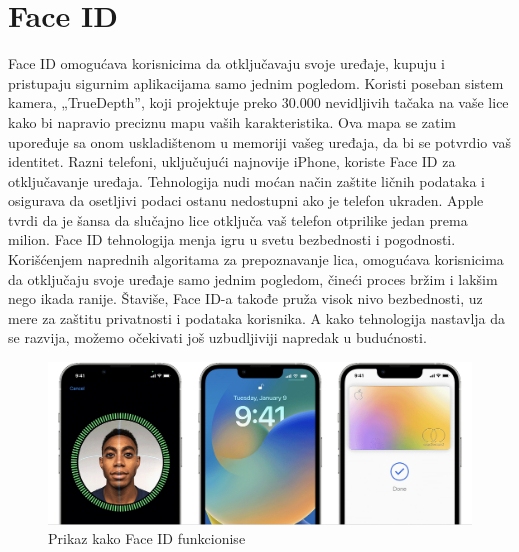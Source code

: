 \documentclass[a4paper]{article}
\begin{document}
\section{Face ID}
\label{sec:faceid}
Face ID omogućava korisnicima da otključavaju svoje uređaje, kupuju i pristupaju sigurnim aplikacijama samo jednim pogledom. Koristi poseban sistem kamera, „TrueDepth”, koji projektuje preko 30.000 nevidljivih tačaka na vaše lice kako bi napravio preciznu mapu vaših karakteristika. Ova mapa se zatim upoređuje sa onom uskladištenom u memoriji vašeg uređaja, da bi se potvrdio vaš identitet. 
Razni telefoni, uključujući najnovije iPhone, koriste Face ID za otključavanje uređaja. Tehnologija nudi moćan način zaštite ličnih podataka i osigurava da osetljivi podaci ostanu nedostupni ako je telefon ukraden. Apple tvrdi da je šansa da slučajno lice otključa vaš telefon otprilike jedan prema milion. 
Face ID tehnologija menja igru u svetu bezbednosti i pogodnosti. Korišćenjem naprednih algoritama za prepoznavanje lica, omogućava korisnicima da otključaju svoje uređaje samo jednim pogledom, čineći proces bržim i lakšim nego ikada ranije. Štaviše, Face ID-a takođe pruža visok nivo bezbednosti, uz mere za zaštitu privatnosti i podataka korisnika. A kako tehnologija nastavlja da se razvija, možemo očekivati još uzbudljiviji napredak u budućnosti.

\begin{figure}[h!]
	\begin{center}
		\includegraphics[scale=0.2]{image2.png}
	\end{center}
	\caption{Prikaz kako Face ID funkcionise}
\end{figure}
\end{document}
